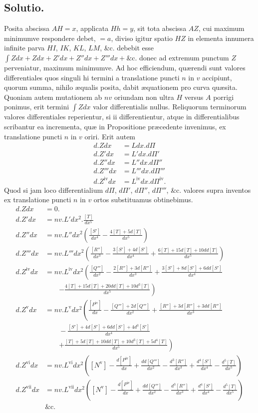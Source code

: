 \subsection*{Solutio.}
Posita abscissa $AH=x$, applicata $Hh=y$, sit tota abscissa $AZ$, cui maximum minimumve respondere debet, $=a$, diviso igitur spatio $HZ$ in elementa innumera infinite parva $HI$, $IK$, $KL$, $LM$, \&c. debebit esse $\int Zdx+Zdx+Z'dx+Z''dx+Z'''dx+\text{\&c.}$ donec ad extremum punctum $Z$ perveniatur, maximum minimumve. Ad hoc efficiendum, quærendi sunt valores differentiales quos singuli hi termini a translatione puncti $n$ in $v$ accipiunt, quorum summa, nihilo æqualis posita, dabit æquationem pro curva quæsita. Quoniam autem mutationem ab $nv$ oriundam non ultra $H$ versus $A$ porrigi ponimus, erit termini $\int Zdx$ valor differentialis nullus. Reliquorum terminorum valores differentiales reperientur, si ii differentientur, atque in differentialibus scribantur ea incrementa, quæ in Propositione præcedente invenimus, ex translatione puncti $n$ in $v$ oriri. Erit autem
\[\begin{aligned}
d.Zdx&=Ldx.d\Pi\\
d.Z'dx&=L'dx.d\Pi'\\
d.Z''dx&=L''dx.d\Pi''\\
d.Z'''dx&=L'''dx.d\Pi'''\\
d.Z^{\mathrm{iv}}dx&=L^{\mathrm{iv}}dx.d\Pi^{\mathrm{iv}}.
\end{aligned}\]
Quod si jam loco differentialium $d\Pi$, $d\Pi'$, $d\Pi''$, $d\Pi'''$, \&c. valores supra inventos ex translatione puncti $n$ in $v$ ortos substituamus obtinebimus.
\[\begin{aligned}
d.Zdx&=0.\\
d.Z'dx&=nv.L'dx^2.\frac{[T]}{dx^5}\\
d.Z''dx&=nv.L''dx^2\left(\frac{[S']}{dx^4}-\frac{4[T]+5d[T]}{dx^5}\right)\\
d.Z'''dx&=nv.L'''dx^2\left(\frac{[R'']}{dx^3}-\frac{3[S']+4d[S']}{dx^4}+\frac{6[T]+15d[T]+10dd[T]}{dx^5}\right)\\
d.Z^{\mathrm{iv}}dx&=nv.L^{\mathrm{iv}}dx^2\left(\frac{[Q''']}{dx^2}-\frac{2[R'']+3d[R'']}{dx^3}+\frac{3[S']+8d[S']+6dd[S']}{dx^4}\right.\\&\qquad\left.-\frac{4[T]+15d[T]+20dd[T]+10d^3[T]}{dx^5}\right)\\
d.Z^{\mathrm{v}}dx&=nv.L^{\mathrm{v}}dx^2\left(\frac{[P^{\mathrm{iv}}]}{dx}-\frac{[Q''']+2d[Q''']}{dx^2}+\frac{[R'']+3d[R'']+3dd[R'']}{dx^3}\right.\\&\qquad-\frac{[S']+4d[S']+6dd[S']+4d^3[S']}{dx^4}\\&\qquad\left.+\frac{[T]+5d[T]+10dd[T]+10d^3[T]+5d^4[T]}{dx^5}\right)\\
d.Z^{\mathrm{vi}}dx&=nv.L^{\mathrm{vi}}dx^2\left([N^{\mathrm{v}}]-\frac{d[P^{\mathrm{iv}}]}{dx}+\frac{dd[Q''']}{dx^2}-\frac{d^3[R'']}{dx^3}+\frac{d^4[S']}{dx^4}-\frac{d^5[T]}{dx^5}\right)\\
d.Z^{\mathrm{vii}}dx&=nv.L^{\mathrm{vii}}dx^2\left([N^{\mathrm{v}}]-\frac{d[P^{\mathrm{iv}}]}{dx}+\frac{dd[Q''']}{dx^2}-\frac{d^3[R'']}{dx^3}+\frac{d^4[S']}{dx^4}-\frac{d^5[T]}{dx^5}\right)\\&\text{\&c.}
\end{aligned}\]
